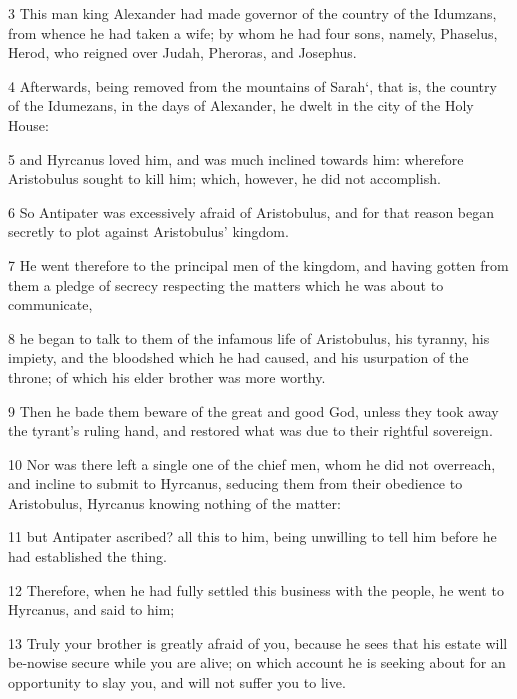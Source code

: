 \par 3 This man king Alexander had made governor of the country of the Idumzans, from whence he had taken a wife; by whom he had four sons, namely, Phaselus, Herod, who reigned over Judah, Pheroras, and Josephus. 

\par 4 Afterwards, being removed from the mountains of Sarah‘, that is, the country of the Idumezans, in the days of Alexander, he dwelt in the city of the Holy House: 

\par 5 and Hyrcanus loved him, and was much inclined towards him: wherefore Aristobulus sought to kill him; which, however, he did not accomplish. 

\par 6 So Antipater was excessively afraid of Aristobulus, and for that reason began secretly to plot against Aristobulus’ kingdom. 

\par 7 He went therefore to the principal men of the kingdom, and having gotten from them a pledge of secrecy respecting the matters which he was about to communicate, 

\par 8 he began to talk to them of the infamous life of Aristobulus, his tyranny, his impiety, and the bloodshed which he had caused, and his usurpation of the throne; of which his elder brother was more worthy. 

\par 9 Then he bade them beware of the great and good God, unless they took away the tyrant’s ruling hand, and restored what was due to their rightful sovereign. 

\par 10 Nor was there left a single one of the chief men, whom he did not overreach, and incline to submit to Hyrcanus, seducing them from their obedience to Aristobulus, Hyrcanus knowing nothing of the matter: 

\par 11 but Antipater ascribed? all this to him, being unwilling to tell him before he had established the thing. 

\par 12 Therefore, when he had fully settled this business with the people, he went to Hyrcanus, and said to him; 

\par 13 Truly your brother is greatly afraid of you, because he sees that his estate will be-nowise secure while you are alive; on which account he is seeking about for an opportunity to slay you, and will not suffer you to live. 

